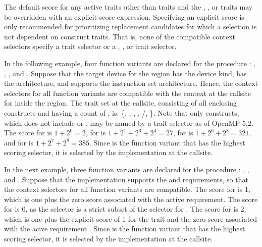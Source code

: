 The default score for any active traits other than  traits and 
the , , or  traits may be overridden with an
explicit score expression. Specifying an explicit score is only recommended
for prioritizing replacement candidates for which a selection is not 
dependent on construct traits. That is, none of the compatible context
selectors specify a  trait selector or a ,
, or  trait selector. 

In the following example, four function variants are declared for the procedure
: , , , and . Suppose that
the target device for the  region has the  device kind,
has the  architecture, and supports the  instruction set
architecture. Hence, the context selectors for all function variants are
compatible with the context at the callsite for  inside the
 region. The  trait set at the callsite,
consisting of all enclosing constructs and having a count of , is:
\{, , , ,
/, \}. Note that only 
constructs, which does not include  or , may be
named by a  trait selector as of OpenMP 5.2. The score for
 is $1+2^0=2$, for  is $1+2^1+2^3+2^4=27$,
for  is $1+2^6+2^8=321$, and for  is $1+2^7+2^8=385$.
Since  is the function variant that has the highest scoring
selector, it is selected by the implementation at the callsite.



In the next example, three function variants are declared for the procedure
: , , and 
. Suppose that the implementation supports the 
 and  requirements, so that
the context selectors for all function variants are compatible. The score for 
 is 1, which is one plus the zero score associated with
the active  requirement. The score for 
 is 0, as the selector is a strict subset of the 
selector for . The score for 
 is 2, which is one plus the explicit score of 1
for the  trait and the zero score associated with the acive
 requirement . Since 
is the function variant that has the highest scoring selector, it is selected
by the implementation at the callsite.


